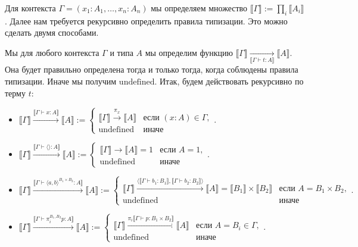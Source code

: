 \documentclass[openany]{book}
\theoremstyle{plain}
\theoremstyle{definition}
\begin{document}
Для контекста \(\Gamma = (x_1 : A_1, \dots, x_n : A_n)\) мы определяем множество \(\llbracket \Gamma \rrbracket := \prod_i \llbracket A_i \rrbracket\). Далее нам требуется рекурсивно определить правила типизации. Это можно сделать двумя способами. 

Мы для любого контекста \(\Gamma\) и типа \(A\) мы определим функцию \(\llbracket \Gamma \rrbracket \underset{\llbracket \Gamma \vdash t : A \rrbracket}{\to} \llbracket A \rrbracket\). Она будет правильно определена тогда и только тогда, когда соблюдены правила типизации. Иначе мы получим \(\mathrm{undefined}\). Итак, будем действовать рекурсивно по терму \(t\):
\begin{itemize}
    \item \(\llbracket \Gamma \rrbracket \overset{\llbracket \Gamma \vdash x : A \rrbracket}{\longrightarrow} \llbracket A \rrbracket := \begin{cases}\llbracket \Gamma \rrbracket \overset{\pi_x}{\longrightarrow} \llbracket A \rrbracket & \text{если }(x:A) \in \Gamma,\\ \text{undefined} & \text{иначе}\end{cases}.\)

    \item \(\llbracket \Gamma \rrbracket \overset{\llbracket \Gamma \vdash \langle \rangle : A \rrbracket}{\longrightarrow} \llbracket A \rrbracket := \begin{cases}\llbracket \Gamma \rrbracket \overset{}{\longrightarrow} \llbracket A \rrbracket = 1 & \text{если }A=1,\\ \text{undefined} & \text{иначе}\end{cases}.\)

    \item \(\llbracket \Gamma \rrbracket \overset{\llbracket \Gamma \vdash \langle a, b \rangle^{B_1 \times B_2} : A \rrbracket}{\longrightarrow} \llbracket A \rrbracket := \begin{cases}\llbracket \Gamma \rrbracket \overset{\langle \llbracket \Gamma \vdash b_1 : B_1 \rrbracket, \llbracket \Gamma \vdash b_2 : B_2 \rrbracket \rangle}{\longrightarrow} \llbracket A \rrbracket = \llbracket B_1 \rrbracket \times \llbracket B_2 \rrbracket & \text{если }A=B_1 \times B_2,\\ \text{undefined} & \text{иначе}\end{cases}.\)

    \item \(\llbracket \Gamma \rrbracket \overset{\llbracket \Gamma \vdash \pi_i^{B_1, B_2} p : A \rrbracket}{\longrightarrow} \llbracket A \rrbracket := \begin{cases}\llbracket \Gamma \rrbracket \overset{\pi_i \llbracket \Gamma \vdash p : B_1 \times B_2 \rrbracket}{\longrightarrow} \llbracket A \rrbracket & \text{если }A = B_i \in \Gamma,\\ \text{undefined} & \text{иначе}\end{cases}.\)


\end{itemize}
\end{document}
